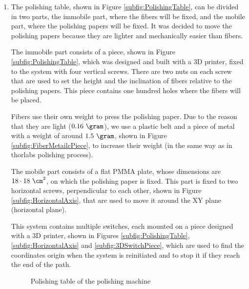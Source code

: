 \begin{enumerate}
\item{} The polishing table, shown in Figure \ref{subfig:PolishingTable}, can be divided in two parts, the immobile part, where the fibers will be fixed, and the mobile part, where the polishing papers will be fixed. It was decided to move the polishing papers because they are lighter and mechanically easier than fibers.

The immobile part consists of a piece, shown in Figure \ref{subfig:PolishingTable}, which was designed and built with a 3D printer, fixed to the system with four vertical screws. There are two nuts on each screw that are used to set the height and the inclination of fibers relative to the polishing papers. This piece contains one hundred holes where the fibers will be placed. 

Fibers use their own weight to press the polishing paper. Due to the reason that they are light ($0.16~\gram$), we use a plastic belt and a piece of metal with a weight of around $1.5~\gram$, shown in Figure \ref{subfig:FiberMetailcPiece}, to increase their weight (in the same way as in thorlabs polishing process).

The mobile part consists of a flat PMMA plate, whose dimensions are $18 \cdot{} 18~\cm^2$, on which the polishing paper is fixed. This part is fixed to two horizontal screws, perpendicular to each other, shown in Figure \ref{subfig:HorizontalAxis}, that are used to move it around the XY plane (horizontal plane).

This system contains multiple switches, each mounted on a piece designed with a 3D printer, shown in Figures \ref{subfig:PolishingTable}, \ref{subfig:HorizontalAxis} and \ref{subfig:3DSwitchPiece}, which are used to find the coordinates origin when the system is reinitiated and to stop it if they reach the end of the path. 

\begin{figure}[htbp]
 \centering
    \newline
 \caption{Polishing table of the polishing machine}
 \label{fig:PolishingTable}
\end{figure}


\end{enumerate}

